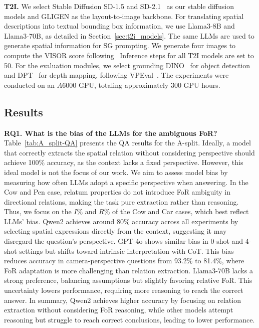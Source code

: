 \noindent\textbf{T2I.}
We select Stable Diffusion SD-1.5 and SD-2.1~\citep{rombach2021highresolution} as our stable diffusion models and GLIGEN\citep{li2023gligenopensetgroundedtexttoimage} as the layout-to-image backbone.
For translating spatial descriptions into textual bounding box information, we use Llama3-8B and Llama3-70B, as detailed in Section~\ref{sec:t2i_models}. 
The same LLMs are used to generate spatial information for SG prompting. 
We generate four images to compute the VISOR score following~\cite{gokhale2023benchmarkingspatialrelationshipstexttoimage}
Inference steps for all T2I models are set to 50.
For the evaluation modules, we select grounding DINO~\citep{liu2024groundingdinomarryingdino} for object detection and DPT~\citep{ranftl2021visiontransformersdenseprediction} for depth mapping, following VPEval~\cite{cho2023visualprogrammingtexttoimagegeneration}. The experiments were conducted on an $A6000$ GPU, totaling approximately $300$ GPU hours.

\subsection{Results}

\noindent\textbf{RQ1. What is the bias of the LLMs for the ambiguous FoR? }
Table~\ref{tab:A_split-QA} presents the QA results for the A-split. 
Ideally, a model that correctly extracts the spatial relation without considering perspective should achieve 100\% accuracy, as the context lacks a fixed perspective. 
However, this ideal model is not the focus of our work. We aim to assess model bias by measuring how often LLMs adopt a specific perspective when answering.
In the Cow and Pen case, relatum properties do not introduce FoR ambiguity in directional relations, making the task pure extraction rather than reasoning.
Thus, we focus on the $I$\% and $R$\% of the Cow and Car cases, which best reflect LLMs’ bias.
Qwen2 achieves around 80\% accuracy across all experiments by selecting spatial expressions directly from the context, suggesting it may disregard the question’s perspective.
GPT-4o shows similar bias in 0-shot and 4-shot settings but shifts toward intrinsic interpretation with CoT. This bias reduces accuracy in camera-perspective questions from 93.2\% to 81.4\%, where FoR adaptation is more challenging than relation extraction. 
Llama3-70B lacks a strong preference, balancing assumptions but slightly favoring relative FoR. This uncertainty lowers performance, requiring more reasoning to reach the correct answer.
In summary, Qwen2 achieves higher accuracy by focusing on relation extraction without considering FoR reasoning, while other models attempt reasoning but struggle to reach correct conclusions, leading to lower performance.


